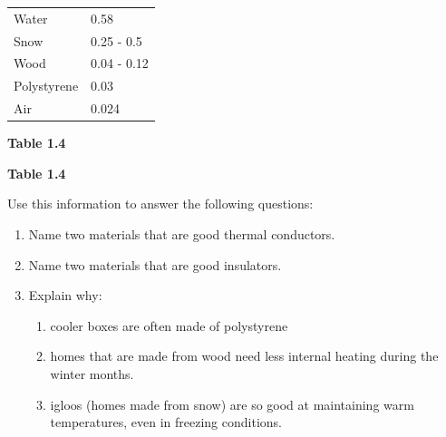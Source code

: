 \begin{table}[H]
\begin{center}
\begin{xtabular}[t]{|l|l|}
        Water &
        0.58%
     \tabularnewline{}
        Snow &
        0.25 - 0.5%
     \tabularnewline{}
        Wood &
        0.04 - 0.12%
     \tabularnewline{}
        Polystyrene &
        0.03%
     \tabularnewline{}
        Air &
        0.024%
     \tabularnewline{}
    \end{xtabular}
      \end{center}
    \begin{center}{\small\bfseries Table 1.4}\end{center}
    \begin{caption}{\small\bfseries Table 1.4}\end{caption}
\end{table}
    \par
      \label{m38706*id67009}Use this information to answer the following questions:\par 
      \label{m38706*id67013}\begin{enumerate}[noitemsep, label=\textbf{\arabic*}. ] 
            \label{m38706*uid105}\item Name two materials that are good thermal conductors.
\label{m38706*uid106}\item Name two materials that are good insulators.
\label{m38706*uid107}\item Explain why:
\label{m38706*id67053}\begin{enumerate}[noitemsep, label=\textbf{\alph*}. ] 
            \label{m38706*uid108}\item cooler boxes are often made of polystyrene
\label{m38706*uid109}\item homes that are made from wood need less internal heating during the winter months.
\label{m38706*uid110}\item igloos (homes made from snow) are so good at maintaining warm temperatures, even in freezing conditions.
\end{enumerate}
        \end{enumerate}
